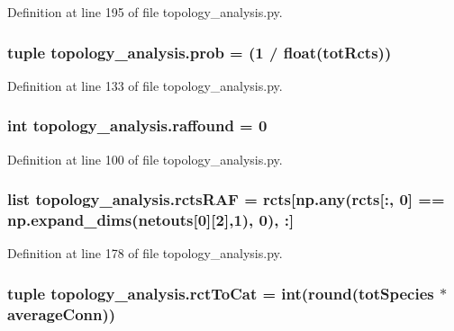 Definition at line 195 of file topology\-\_\-analysis.\-py.

\hypertarget{a00128_aad2c05e3d2146196ed236911dd796f6e}{
\subsubsection[{prob}]{\setlength{\rightskip}{0pt plus 5cm}tuple topology\-\_\-analysis.\-prob = (1 / float({\bf tot\-Rcts}))}}\label{a00128_aad2c05e3d2146196ed236911dd796f6e}


Definition at line 133 of file topology\-\_\-analysis.\-py.

\hypertarget{a00128_ad625a009a3da81a04b490e62975ecf39}{
\subsubsection[{raffound}]{\setlength{\rightskip}{0pt plus 5cm}int topology\-\_\-analysis.\-raffound = 0}}\label{a00128_ad625a009a3da81a04b490e62975ecf39}


Definition at line 100 of file topology\-\_\-analysis.\-py.

\hypertarget{a00128_aeb909c76682b690cc5ab6aca5ac37c4d}{
\subsubsection[{rcts\-R\-A\-F}]{\setlength{\rightskip}{0pt plus 5cm}list topology\-\_\-analysis.\-rcts\-R\-A\-F = rcts\mbox{[}np.\-any(rcts\mbox{[}\-:, 0\mbox{]} == np.\-expand\-\_\-dims({\bf netouts}\mbox{[}0\mbox{]}\mbox{[}2\mbox{]},1), 0), \-:\mbox{]}}}\label{a00128_aeb909c76682b690cc5ab6aca5ac37c4d}


Definition at line 178 of file topology\-\_\-analysis.\-py.

\hypertarget{a00128_afa804d4b1d39a63de9f14e5ab379ae34}{
\subsubsection[{rct\-To\-Cat}]{\setlength{\rightskip}{0pt plus 5cm}tuple topology\-\_\-analysis.\-rct\-To\-Cat = int(round({\bf tot\-Species} $\ast$ {\bf average\-Conn}))}}\label{a00128_afa804d4b1d39a63de9f14e5ab379ae34}


